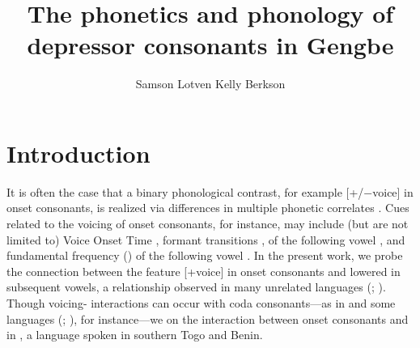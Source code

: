 \documentclass[output=paper
,newtxmath
,modfonts
,nonflat]{langsci/langscibook}
\author{Samson Lotven\affiliation{Indiana University Bloomington} \lastand Kelly Berkson\affiliation{Indiana University Bloomington} }
\title{The phonetics and phonology of depressor consonants in Gengbe}
\begin{document}
\maketitle
 \newcommand{\nocaption}[1]{{\color{red} Please provide a caption}}
 

 

 

 

 

 

\section{Introduction}\label{sec:lotven:1}
It is often the case that a binary phonological contrast, for example [+/−voice] in onset consonants, is realized via differences in multiple phonetic correlates \citep{wright2004}. Cues related to the voicing of onset consonants, for instance, may include (but are not limited to) Voice Onset Time \citep{Lisker1964}, formant transitions \citep{Stevens1973},  of the following vowel \citep{Chistovich1969}, and fundamental frequency ()  of the following vowel \citep{Shimizu1989}. In the present work, we probe the connection between the feature [+voice] in onset consonants and lowered  in subsequent vowels, a relationship observed in many unrelated languages (\citealt{Bradshaw1999}; \citealt{Tang2008}). Though voicing- interactions can occur with coda consonants—as in  and some  languages (\citealt{Maran1973}; \citealt{Matisoff1973}), for instance—we  on the interaction between onset consonants and  in , a  language spoken in southern Togo and Benin.
\end{document}
